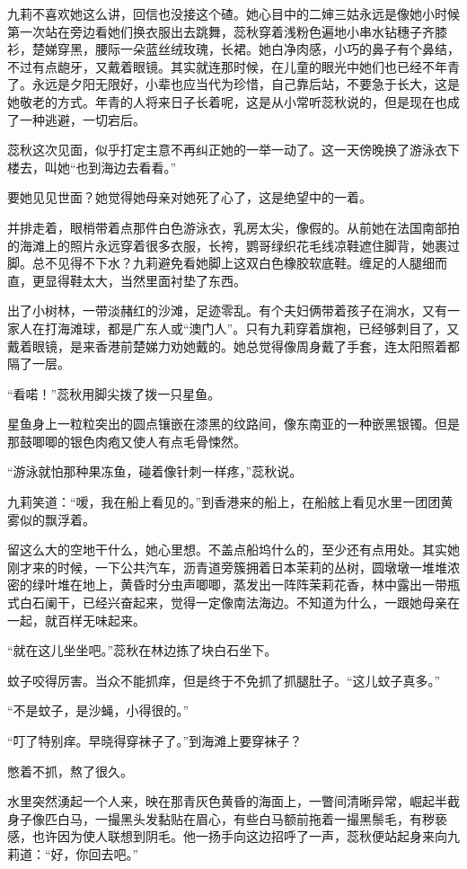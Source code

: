 \par 九莉不喜欢她这么讲，回信也没接这个碴。她心目中的二婶三姑永远是像她小时候第一次站在旁边看她们换衣服出去跳舞，蕊秋穿着浅粉色遍地小串水钻穗子齐膝衫，楚娣穿黑，腰际一朵蓝丝绒玫瑰，长裙。她白净肉感，小巧的鼻子有个鼻结，不过有点龅牙，又戴着眼镜。其实就连那时候，在儿童的眼光中她们也已经不年青了。永远是夕阳无限好，小辈也应当代为珍惜，自己靠后站，不要急于长大，这是她敬老的方式。年青的人将来日子长着呢，这是从小常听蕊秋说的，但是现在也成了一种逃避，一切宕后。
\par 蕊秋这次见面，似乎打定主意不再纠正她的一举一动了。这一天傍晚换了游泳衣下楼去，叫她“也到海边去看看。”
\par 要她见见世面？她觉得她母亲对她死了心了，这是绝望中的一着。
\par 并排走着，眼梢带着点那件白色游泳衣，乳房太尖，像假的。从前她在法国南部拍的海滩上的照片永远穿着很多衣服，长袴，鹦哥绿织花毛线凉鞋遮住脚背，她裹过脚。总不见得不下水？九莉避免看她脚上这双白色橡胶软底鞋。缠足的人腿细而直，更显得鞋太大，当然里面衬垫了东西。
\par 出了小树林，一带淡赭红的沙滩，足迹零乱。有个夫妇俩带着孩子在淌水，又有一家人在打海滩球，都是广东人或“澳门人”。只有九莉穿着旗袍，已经够刺目了，又戴着眼镜，是来香港前楚娣力劝她戴的。她总觉得像周身戴了手套，连太阳照着都隔了一层。
\par “看喏！”蕊秋用脚尖拨了拨一只星鱼。
\par 星鱼身上一粒粒突出的圆点镶嵌在漆黑的纹路间，像东南亚的一种嵌黑银镯。但是那鼓唧唧的银色肉疱又使人有点毛骨悚然。
\par “游泳就怕那种果冻鱼，碰着像针刺一样疼，”蕊秋说。
\par 九莉笑道：“嗳，我在船上看见的。”到香港来的船上，在船舷上看见水里一团团黄雾似的飘浮着。
\par 留这么大的空地干什么，她心里想。不盖点船坞什么的，至少还有点用处。其实她刚才来的时候，一下公共汽车，沥青道旁簇拥着日本茉莉的丛树，圆墩墩一堆堆浓密的绿叶堆在地上，黄昏时分虫声唧唧，蒸发出一阵阵茉莉花香，林中露出一带瓶式白石阑干，已经兴奋起来，觉得一定像南法海边。不知道为什么，一跟她母亲在一起，就百样无味起来。
\par “就在这儿坐坐吧。”蕊秋在林边拣了块白石坐下。
\par 蚊子咬得厉害。当众不能抓痒，但是终于不免抓了抓腿肚子。“这儿蚊子真多。”
\par “不是蚊子，是沙蝇，小得很的。”
\par “叮了特别痒。早晓得穿袜子了。”到海滩上要穿袜子？
\par 憋着不抓，熬了很久。
\par 水里突然湧起一个人来，映在那青灰色黄昏的海面上，一瞥间清晰异常，崛起半截身子像匹白马，一撮黑头发黏贴在眉心，有些白马额前拖着一撮黑鬃毛，有秽亵感，也许因为使人联想到阴毛。他一扬手向这边招呼了一声，蕊秋便站起身来向九莉道：“好，你回去吧。”
